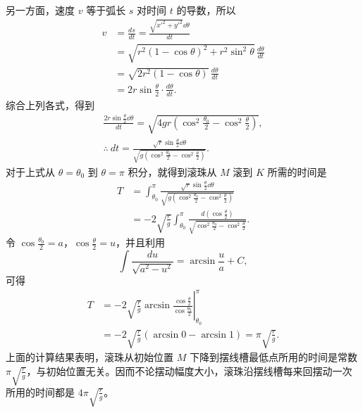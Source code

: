 另一方面，速度 $v$ 等于弧长 $s$ 对时间 $t$ 的导数，所以
\begin{align*}
  v &= \frac{ds}{dt} = \frac{\sqrt{x'^2 + y'^2}\dd\theta}{dt} \\
    &= \sqrt{r^2(1 - \cos\theta)^2 + r^2\sin^2\theta}\,\frac{d\theta}{dt} \\
    &= \sqrt{2r^2(1 - \cos\theta)}\,\frac{d\theta}{dt} \\
    &= 2r\sin\frac{\theta}{2} \cdot \frac{d\theta}{dt}.
\end{align*}
综合上列各式，得到
\begin{gather*}
  \frac{2r\sin\frac{\theta}{2}\dd\theta}{dt} = \sqrt{4gr\left(\cos^2\frac{\theta_0}{2} - \cos^2\frac{\theta}{2}\right)}, \\
  \therefore\ dt = \frac{\sqrt{r}\sin\frac{\theta}{2}\dd\theta}{\sqrt{g\left(\cos^2\frac{\theta_0}{2} - \cos^2\frac{\theta}{2}\right)}}.
\end{gather*}
对于上式从 $\theta = \theta_0$ 到 $\theta = \pi$ 积分，就得到滚珠从 $M$ 滚到 $K$ 所需的时间是
\begin{align*}
  T &= \int_{\theta_0}^{\pi} \frac{\sqrt{r}\sin\frac{\theta}{2}\dd\theta}{\sqrt{g\left(\cos^2\frac{\theta_0}{2} - \cos^2\frac{\theta}{2}\right)}} \\
    &= -2\sqrt{\frac{r}{g}} \int_{\theta_0}^{\pi} \frac{d\left(\cos\frac{\theta}{2}\right)}{\sqrt{\cos^2\frac{\theta_0}{2} - \cos^2\frac{\theta}{2}}}.
\end{align*}
令 $\cos\frac{\theta_0}{2} = a$，$\cos\frac{\theta}{2} = u$，并且利用
\[
  \int \frac{du}{\sqrt{a^2 - u^2}} = \arcsin\frac{u}{a} + C,
\]
可得
\begin{align*}
  T &= \left.-2\sqrt{\frac{r}{g}}\arcsin\frac{\cos\frac{\theta}{2}}{\cos\frac{\theta_0}{2}}\right|_{\theta_0}^{\pi} \\
    &= -2\sqrt{\frac{r}{g}}(\arcsin 0 - \arcsin 1) = \pi\sqrt{\frac{r}{g}}.
\end{align*}
上面的计算结果表明，滚珠从初始位置 $M$ 下降到摆线槽最低点所用的时间是常数 $\pi\sqrt{\frac{r}{g}}$，与初始位置无关。因而不论摆动幅度大小，滚珠沿摆线槽每来回摆动一次所用的时间都是 $4\pi\sqrt{\frac{r}{g}}$。
